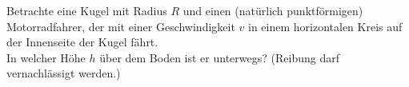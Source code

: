 \begin{Exercise}[label = Motorrad in der Kugel, origin = Maximilian Marienhagen, difficulty = 2, title = Motorrad in der Kugel]Betrachte eine Kugel mit Radius $R$ und einen (natürlich punktförmigen) Motorradfahrer, der mit einer Geschwindigkeit $v$ in einem horizontalen Kreis auf der Innenseite der Kugel fährt.\\ In welcher Höhe $h$ über dem Boden ist er unterwegs? (Reibung darf vernachlässigt werden.)
\end{Exercise}